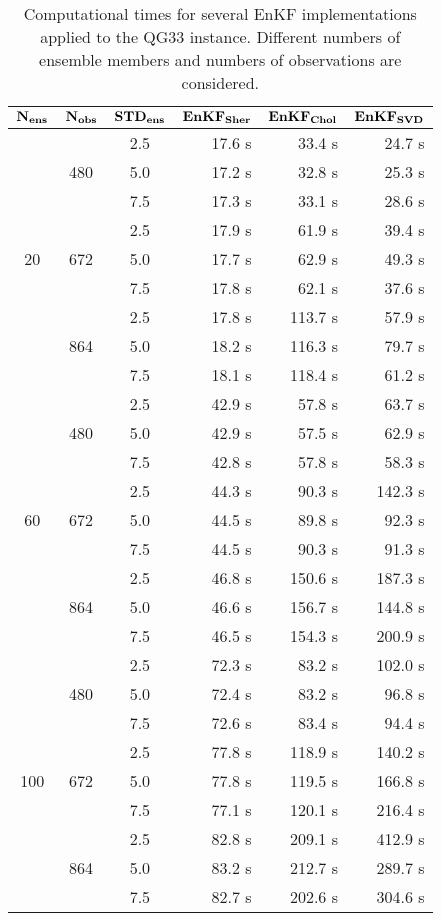 \documentclass[12pt]{article}
\begin{document}
\begin{table}[H]
\centering
{\footnotesize
\begin{tabular}{|c|c|c|r|r|r|} \hline
$\bf N_{ens}$ & $\bf N_{obs}$ & $\bf STD_{ens}$ & ${\bf EnKF_{Sher}}$ & ${\bf EnKF_{Chol}}$ & ${\bf EnKF_{SVD}}$ \\ \hline
\multirow{9}{*}{20} &  \multirow{3}{*}{480}  & 2.5 & 17.6 s & 33.4 s & 24.7 s\\
& & 5.0 & 17.2 s & 32.8 s & 25.3 s \\ 
& & 7.5 & 17.3 s & 33.1 s & 28.6 s  \\ 
\cline{2-6}
&  \multirow{3}{*}{672}  & 2.5 & 17.9 s & 61.9 s & 39.4 s \\
& & 5.0 & 17.7 s & 62.9 s & 49.3 s \\ 
& & 7.5 & 17.8 s & 62.1 s & 37.6 s \\ 
\cline{2-6}
&  \multirow{3}{*}{864}  & 2.5 & 17.8 s & 113.7 s & 57.9 s \\
& & 5.0 & 18.2 s & 116.3 s & 79.7 s \\ 
& & 7.5 & 18.1 s & 118.4 s & 61.2 s \\ 
\cline{1-6}
\multirow{9}{*}{60} &  \multirow{3}{*}{480}  & 2.5 & 42.9 s & 57.8 s & 63.7 s \\
& & 5.0 & 42.9 s & 57.5 s & 62.9 s \\ 
& & 7.5 & 42.8 s & 57.8 s & 58.3 s \\ 
\cline{2-6}
&  \multirow{3}{*}{672}  & 2.5 & 44.3 s & 90.3 s & 142.3 s\\
& & 5.0 & 44.5 s & 89.8 s & 92.3 s \\ 
& & 7.5 & 44.5 s & 90.3 s & 91.3 s \\ 
\cline{2-6}
&  \multirow{3}{*}{864}  & 2.5 & 46.8 s & 150.6 s & 187.3 s \\
& & 5.0 & 46.6 s & 156.7 s & 144.8 s \\ 
& & 7.5 & 46.5 s & 154.3 s & 200.9 s \\ 
\cline{1-6}
\multirow{9}{*}{100} &  \multirow{3}{*}{480}  & 2.5 & 72.3 s & 83.2 s & 102.0 s \\
& & 5.0 & 72.4 s & 83.2 s & 96.8 s \\ 
& & 7.5 & 72.6 s & 83.4 s & 94.4 s \\ 
\cline{2-6}
&  \multirow{3}{*}{672}  & 2.5 & 77.8 s & 118.9 s & 140.2 s \\
& & 5.0 & 77.8 s & 119.5 s & 166.8 s \\ 
& & 7.5 & 77.1 s & 120.1 s & 216.4 s \\ 
\cline{2-6}
&  \multirow{3}{*}{864}  & 2.5 & 82.8 s & 209.1 s & 412.9 s \\
& & 5.0 & 83.2 s & 212.7 s & 289.7 s \\ 
& & 7.5 & 82.7 s & 202.6 s & 304.6 s \\ 
\hline
\end{tabular}
}
\caption{Computational times for several EnKF implementations applied to the QG33 instance.
Different numbers of ensemble members and numbers of observations are considered.}
\label{Tab:QG33-Results-ElapsedTime}
\end{table}
\end{document}
